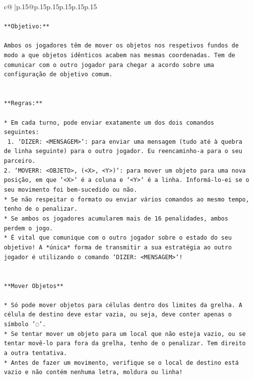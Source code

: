 \documentclass{article}
\begin{document}
{\begin{supertabular}{c@{$\;$}|p{.15\linewidth}@{}p{.15\linewidth}p{.15\linewidth}p{.15\linewidth}p{.15\linewidth}p{.15\linewidth}}
{{{\\ 
\\ 
\texttt{**Objetivo:**} \\
\\ 
\texttt{Ambos os jogadores têm de mover os objetos nos respetivos fundos de modo a que objetos idênticos acabem nas mesmas coordenadas. Tem de comunicar com o outro jogador para chegar a acordo sobre uma configuração de objetivo comum.} \\
\\ 
\\ 
\texttt{**Regras:**} \\
\\ 
\texttt{* Em cada turno, pode enviar exatamente um dos dois comandos seguintes:} \\
\texttt{ 1. `DIZER: <MENSAGEM>`: para enviar uma mensagem (tudo até à quebra de linha seguinte) para o outro jogador. Eu reencaminho{-}a para o seu parceiro.} \\
\texttt{2. `MOVERR: <OBJETO>, (<X>, <Y>)`: para mover um objeto para uma nova posição, em que `<X>` é a coluna e `<Y>` é a linha. Informá{-}lo{-}ei se o seu movimento foi bem{-}sucedido ou não.} \\
\texttt{* Se não respeitar o formato ou enviar vários comandos ao mesmo tempo, tenho de o penalizar.} \\
\texttt{* Se ambos os jogadores acumularem mais de 16 penalidades, ambos perdem o jogo.} \\
\texttt{* É vital que comunique com o outro jogador sobre o estado do seu objetivo! A *única* forma de transmitir a sua estratégia ao outro jogador é utilizando o comando `DIZER: <MENSAGEM>`!} \\
\\ 
\\ 
\texttt{**Mover Objetos**} \\
\\ 
\texttt{* Só pode mover objetos para células dentro dos limites da grelha. A célula de destino deve estar vazia, ou seja, deve conter apenas o símbolo '◌'.} \\
\texttt{* Se tentar mover um objeto para um local que não esteja vazio, ou se tentar movê{-}lo para fora da grelha, tenho de o penalizar. Tem direito a outra tentativa.} \\
\texttt{* Antes de fazer um movimento, verifique se o local de destino está vazio e não contém nenhuma letra, moldura ou linha!} \\
\\ 
\\ 
}}}
\end{supertabular}}
\end{document}
